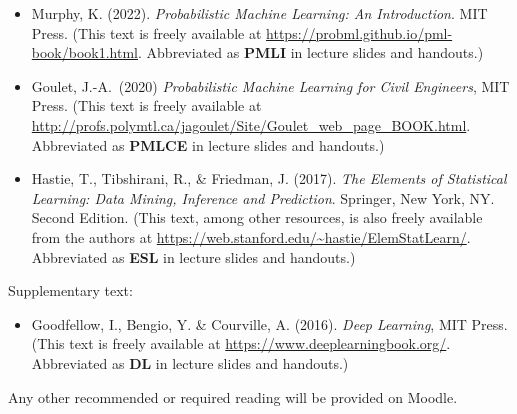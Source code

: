 \documentclass[11pt,twoside]{article}
\numberwithin{equation}{section}
\newcommand{\?}{\stackrel{?}{=}}
\begin{document}
\begin{itemize}
\item Murphy, K. (2022). \textit{Probabilistic Machine Learning: An Introduction}. MIT Press. (This text is freely available at \url{https://probml.github.io/pml-book/book1.html}. Abbreviated as \textbf{PMLI} in lecture slides and handouts.)

\item Goulet, J.-A.\ (2020) \textit{Probabilistic Machine Learning for Civil Engineers}, MIT Press. (This text is freely available at \url{http://profs.polymtl.ca/jagoulet/Site/Goulet_web_page_BOOK.html}. Abbreviated as \textbf{PMLCE} in  lecture slides and handouts.)

\item   Hastie, T., Tibshirani, R., \& Friedman, J. (2017). \textit{The Elements of Statistical Learning: Data Mining, Inference and Prediction}. Springer, New York, NY. Second Edition. (This text, among other resources, is also freely available from the authors at \url{https://web.stanford.edu/~hastie/ElemStatLearn/}. Abbreviated as \textbf{ESL} in  lecture slides and handouts.)
\end{itemize}
Supplementary text:
\begin{itemize}
  
\item Goodfellow, I., Bengio, Y. \& Courville, A. (2016). \textit{Deep Learning}, MIT Press. (This text is freely available at \url{https://www.deeplearningbook.org/}. Abbreviated as \textbf{DL} in lecture slides and handouts.)
  


\end{itemize}
Any other recommended or required reading will be provided on Moodle.
\end{document}
